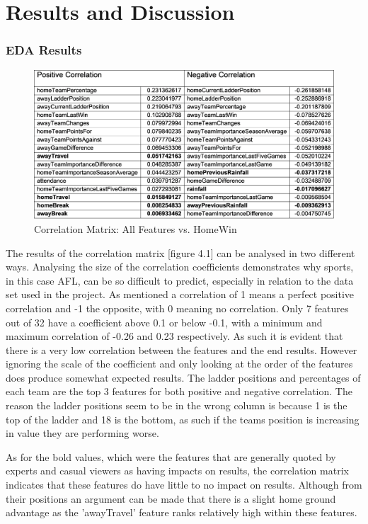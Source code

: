 \documentclass{imc-inf}
\begin{document}
	\chapter{Results and Discussion}\label{chap:Results}
	
	\subsection{EDA Results}
	\begin{figure}
		\caption{Correlation Matrix: All Features vs. HomeWin}
		\includegraphics[width=15cm]{media/eda_correlation.png}
	\end{figure}
	The results of the correlation matrix [figure 4.1] can be analysed in two different ways. Analysing the size of the correlation coefficients demonstrates why sports, in this case AFL, can be so difficult to predict, especially in relation to the data set used in the project. As mentioned a correlation of 1 means a perfect positive correlation and -1 the opposite, with 0 meaning no correlation. Only 7 features out of 32 have a coefficient above 0.1 or below -0.1, with a minimum and maximum correlation of -0.26 and 0.23 respectively. As such it is evident that there is a very low correlation between the features and the end results. However ignoring the scale of the coefficient and only looking at the order of the features does produce somewhat expected results. The ladder positions and percentages of each team are the top 3 features for both positive and negative correlation. The reason the ladder positions seem to be in the wrong column is because 1 is the top of the ladder and 18 is the bottom, as such if the teams position is increasing in value they are performing worse.
	
	As for the bold values, which were the features that are generally quoted by experts and casual viewers as having impacts on results, the correlation matrix indicates that these features do have little to no impact on results. Although from their positions an argument can be made that there is a slight home ground advantage as the 'awayTravel' feature ranks relatively high within these features. 
	
\end{document}
